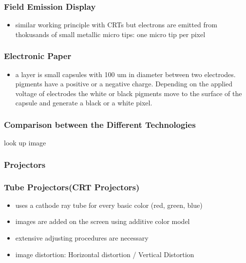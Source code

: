 \documentclass{standalone}
\begin{document}
\subsubsection*{Field Emission Display}
\begin{itemize}
\item similar working principle with CRTs but electrons are emitted from thokusands of small metallic micro tips: one micro tip per pixel
\end{itemize}
\subsubsection*{Electronic Paper}
\begin{itemize}
\item a layer is small capsules with 100 um in diameter between two electrodes. pigments have a positive or a negative charge. Depending on the applied voltage of electrodes the white or black pigments move to the surface of the capsule and generate a black or a white pixel. 
\end{itemize}
\subsubsection*{Comparison between the Different Technologies}
look up image
\subsubsection{Projectors}
\subsubsection*{Tube Projectors(CRT Projectors)}
\begin{itemize}
\item uses a cathode ray tube for every basic color (red, green, blue)
\item images are added on the screen using additive color model
\item extensive adjusting procedures are necessary
\item image distortion: Horizontal distortion / Vertical Distortion
\end{itemize}
\end{document}
